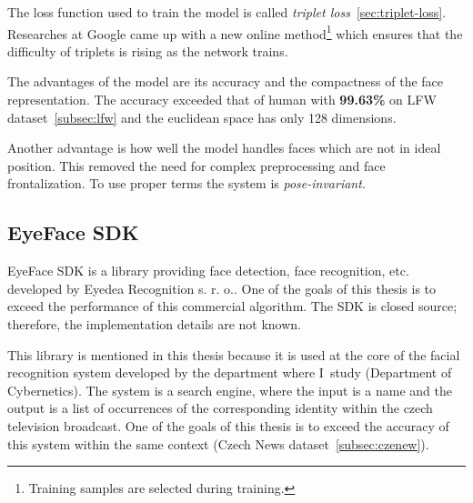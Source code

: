 The loss function used to train the model is called \textit{triplet loss}~\ref{sec:triplet-loss}.
Researches at Google came up with a new online method\footnote{Training samples are selected during training.} which
ensures that the difficulty of triplets is rising as the network trains.

The advantages of the model are its accuracy and the compactness of the face representation.
The accuracy exceeded that of human with \textbf{99.63\%} on LFW dataset~\ref{subsec:lfw} and the euclidean space has
only 128 dimensions.

Another advantage is how well the model handles faces which are not in ideal position.
This removed the need for complex preprocessing and face frontalization.
To use proper terms the system is \textit{pose-invariant}.

\subsection{EyeFace SDK}\label{subsec:eyeface}
EyeFace SDK is a library providing face detection, face recognition, etc. developed by Eyedea Recognition s. r. o..
One of the goals of this thesis is to exceed the performance of this commercial algorithm.
The SDK is closed source; therefore, the implementation details are not known.

This library is mentioned in this thesis because it is used at the core of the facial recognition system developed by
the department where I study (Department of Cybernetics).
The system is a search engine, where the input is a name and the output is a list of occurrences of
the corresponding identity within the czech television broadcast.
One of the goals of this thesis is to exceed the accuracy of this system within the same context
(Czech News dataset~\ref{subsec:czenew}).